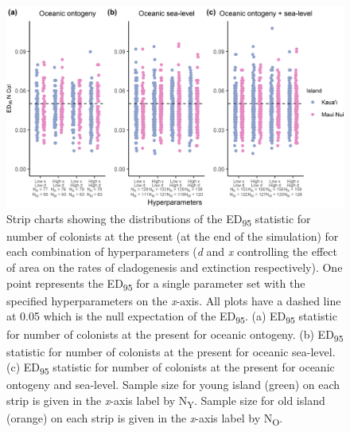 \begin{figure}
    \centering
    \includegraphics{oceanic_hyperparameters_num_col.png}
    \caption{Strip charts showing the distributions of the ED\textsubscript{95} statistic for number of colonists at the present (at the end of the simulation) for each combination of hyperparameters (\textit{d} and \textit{x} controlling the effect of area on the rates of cladogenesis and extinction respectively). One point represents the ED\textsubscript{95} for a single parameter set with the specified hyperparameters on the \textit{x}-axis. All plots have a dashed line at 0.05 which is the null expectation of the ED\textsubscript{95}. (a) ED\textsubscript{95} statistic for number of colonists at the present for oceanic ontogeny. (b) ED\textsubscript{95} statistic for number of colonists at the present for oceanic sea-level. (c) ED\textsubscript{95} statistic for number of colonists at the present for oceanic ontogeny and sea-level. Sample size for young island (green) on each strip is given in the \textit{x}-axis label by N\textsubscript{Y}. Sample size for old island (orange) on each strip is given in the \textit{x}-axis label by N\textsubscript{O}.}
    \label{fig:oceanic_hyperparameters_num_col}
\end{figure}

